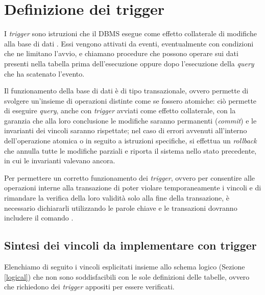 \FloatBarrier

\section{Definizione dei trigger}
\label{physicaltriggers}

I \emph{trigger} sono istruzioni che il DBMS esegue come effetto collaterale di modifiche alla base di dati \cite{Sil11}.
Essi vengono attivati da eventi, eventualmente con condizioni che ne limitano l'avvio, e chiamano procedure che possono operare sui dati presenti nella tabella prima dell'esecuzione oppure dopo l'esecuzione della \emph{query} che ha scatenato l'evento.

Il funzionamento della base di dati è di tipo transazionale, ovvero permette di svolgere un'insieme di operazioni distinte come se fossero atomiche: ciò permette di eseguire \emph{query}, anche con \emph{trigger} avviati come effetto collaterale, con la garanzia che alla loro conclusione le modifiche saranno permanenti (\emph{commit}) e le invarianti dei vincoli saranno rispettate; nel caso di errori avvenuti all'interno dell'operazione atomica o in seguito a istruzioni specifiche, si effettua un \emph{rollback} che annulla tutte le modifiche parziali e riporta il sistema nello stato precedente, in cui le invarianti valevano ancora.

Per permettere un corretto funzionamento dei \emph{trigger}, ovvero per consentire alle operazioni interne alla transazione di poter violare temporaneamente i vincoli e di rimandare la verifica della loro validità solo alla fine della transazione, è necessario dichiararli utilizzando le parole chiave  e le transazioni dovranno includere il comando .

\subsection{Sintesi dei vincoli da implementare con trigger}
\label{physicaltriggerssynthesis}

Elenchiamo di seguito i vincoli esplicitati insieme allo schema logico (Sezione \ref{logical}) che non sono soddisfacibili con le sole definizioni delle tabelle, ovvero che richiedono dei \emph{trigger} appositi per essere verificati.

